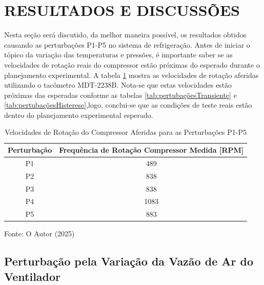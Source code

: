 \section{RESULTADOS E DISCUSSÕES}

Nesta seção será discutido, da melhor maneira possível, os resultados obtidos causando as perturbações P1-P5 no sistema de refrigeração. Antes de iniciar o tópico da variação das temperaturas e pressões, é importante saber se as velocidades de rotação reais do compressor estão próximas do esperado durante o planejamento experimental. A tabela \ref{tab:Rotações Medidas} mostra as velocidades de rotação aferidas utilizando o tacômetro MDT-2238B. Nota-se que estas velocidades estão próximas das esperadas conforme as tabelas \ref{tab:pertubaçõesTransiente} e \ref{tab:pertubaçõesHisterese},logo, conclui-se que as condições de teste reais estão dentro do planejamento experimental esperado.

\begin{table}[htb]
    \centering
    \begin{tabular}{|c|c|}
        \hline
        \textbf{Perturbação} & \textbf{Frequência de Rotação Compressor Medida [RPM]} \\
        \hline
        P1 & 489 \\
        P2 & 838 \\
        P3 & 838 \\        
        P4 & 1083 \\
        P5 & 883 \\
        \hline
    \end{tabular}
    \caption{Velocidades de Rotação do Compressor Aferidas para as Perturbações P1-P5}
    \vspace{5pt} 
{\footnotesize Fonte: O Autor (2025) }
    \label{tab:Rotações Medidas}
\end{table}

\subsection{Perturbação pela Variação da Vazão de Ar do Ventilador} \label{subsec:PertubaçãoVelVentilador}

